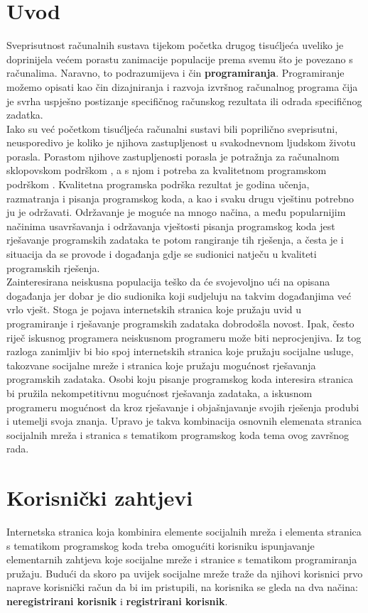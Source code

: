 \documentclass[times, utf8, zavrsni]{fer}
\begin{document}
\chapter{Uvod}
Sveprisutnost računalnih sustava tijekom početka drugog tisućljeća uveliko je doprinijela većem porastu zanimacije populacije prema svemu što je povezano s računalima.  Naravno, to podrazumijeva i čin \textbf{programiranja}. Programiranje možemo opisati kao čin dizajniranja i razvoja izvršnog računalnog programa čija je svrha uspješno postizanje specifičnog računskog rezultata ili odrada specifičnog zadatka.\\
Iako su već početkom tisućljeća računalni sustavi bili poprilično sveprisutni, neusporedivo je koliko je njihova zastupljenost u svakodnevnom ljudskom životu porasla. Porastom njihove zastupljenosti porasla je potražnja za računalnom sklopovskom podrškom , a s njom i potreba za kvalitetnom programskom podrškom . Kvalitetna programska podrška rezultat je godina učenja, razmatranja i pisanja programskog koda, a kao i svaku drugu vještinu potrebno ju je održavati. Održavanje je moguće na mnogo načina, a među popularnijim načinima usavršavanja i održavanja vještosti pisanja programskog koda jest rješavanje programskih zadataka te potom rangiranje tih rješenja, a česta je i situacija da se provode i događanja gdje se sudionici natječu u kvaliteti programskih rješenja.\\
Zainteresirana neiskusna populacija teško da će svojevoljno ući na opisana događanja jer dobar je dio sudionika koji sudjeluju na takvim događanjima već vrlo vješt. Stoga je pojava internetskih stranica koje pružaju uvid u programiranje i rješavanje programskih zadataka dobrodošla novost. Ipak, često riječ iskusnog programera neiskusnom programeru može biti neprocjenjiva. Iz tog razloga zanimljiv bi bio spoj internetskih stranica koje pružaju socijalne usluge, takozvane socijalne mreže  i stranica koje pružaju mogućnost rješavanja programskih zadataka. Osobi koju pisanje programskog koda interesira stranica bi pružila nekompetitivnu mogućnost rješavanja zadataka, a iskusnom programeru mogućnost da kroz rješavanje i objašnjavanje svojih rješenja produbi i utemelji svoja znanja. Upravo je takva kombinacija osnovnih elemenata stranica socijalnih mreža i stranica s tematikom programskog koda tema ovog završnog rada.

\chapter{Korisnički zahtjevi}
Internetska stranica koja kombinira elemente socijalnih mreža i elementa stranica s tematikom programskog koda treba omogućiti korisniku ispunjavanje elementarnih zahtjeva koje socijalne mreže i stranice s tematikom programiranja pružaju. Budući da skoro pa uvijek socijalne mreže traže da njihovi korisnici prvo naprave korisnički račun da bi im pristupili, na korisnika se gleda na dva načina: \textbf{neregistrirani korisnik} i \textbf{registrirani korisnik}. 
\end{document}
